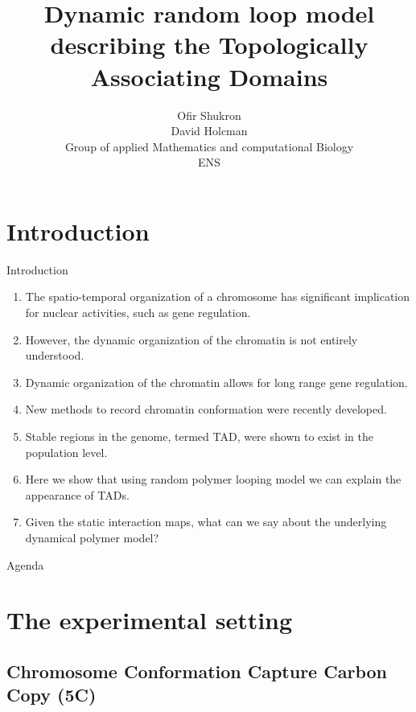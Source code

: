 \documentclass[8pt]{beamer}
\title{Dynamic random loop model describing the Topologically Associating Domains}
\author{Ofir Shukron\\
David Holcman\\
Group of applied Mathematics and computational Biology\\
ENS}
\begin{document}
\begin{frame} %
\titlepage
\end{frame}

\section{Introduction}\label{section_introduction}

\begin{frame}{Introduction}
\begin{enumerate}
\item The spatio-temporal organization of a chromosome has significant implication for nuclear activities, such as gene regulation. 
\item However, the dynamic organization of the chromatin is not entirely understood.
\item Dynamic organization of the chromatin allows for long range gene regulation.
\item New methods to record chromatin conformation were recently developed. 
\item Stable regions in the genome, termed TAD, were shown to exist in the population level. 
\item Here we show that using random polymer looping model we can explain the appearance of TADs.
\item Given the static interaction maps, what can we say about the underlying dynamical polymer model?
\end{enumerate}
\end{frame}

\begin{frame}{Agenda}
\tableofcontents
\end{frame}

\section{The experimental setting}\label{section_theExperimentalSetting}

\subsection{Chromosome Conformation Capture Carbon Copy (5C)}\label{subsection_chromosomeConformationCaptureExperiments}
\end{document}
